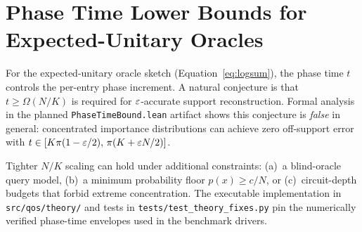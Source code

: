 \section{Phase Time Lower Bounds for Expected-Unitary Oracles}
\label{app:phase}

For the expected-unitary oracle sketch (Equation~\eqref{eq:logsum}), the phase time $t$ controls the per-entry phase increment.  A natural conjecture is that $t \geq \Omega(N/K)$ is required for $\varepsilon$-accurate support reconstruction.  Formal analysis in the planned \texttt{PhaseTimeBound.lean} artifact shows this conjecture is \emph{false} in general: concentrated importance distributions can achieve zero off-support error with $t \in [K\pi(1-\varepsilon/2),\, \pi(K + \varepsilon N/2)]$.

Tighter $N/K$ scaling can hold under additional constraints: (a)~a blind-oracle query model, (b)~a minimum probability floor $p(x) \geq c/N$, or (c)~circuit-depth budgets that forbid extreme concentration.  The executable implementation in \texttt{src/qos/theory/} and tests in \texttt{tests/test\_theory\_fixes.py} pin the numerically verified phase-time envelopes used in the benchmark drivers.
